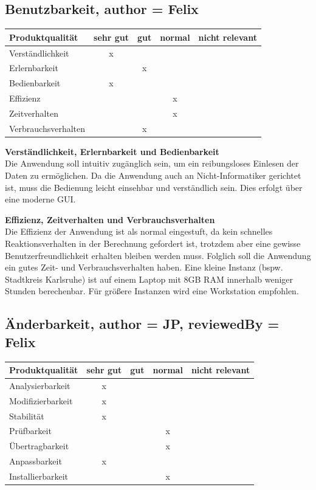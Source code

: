 \documentclass[parskip=full]{scrartcl} %
\begin{document}
\subsection{Benutzbarkeit, author = Felix}

    \begin{tabular}{|l| c| c| c| c|}
    \hline
        Produktqualität & sehr gut & gut & normal & nicht relevant \\
    \hline
        Verständlichkeit & x & & &\\
    \hline
        Erlernbarkeit & & x & &\\
    \hline
        Bedienbarkeit & x & & &\\
    \hline
        Effizienz & & & x &\\
    \hline
        Zeitverhalten & & & x &\\
    \hline
        Verbrauchsverhalten & & x & &\\
    \hline
    \end{tabular}

\textbf{Verständlichkeit, Erlernbarkeit und Bedienbarkeit}\\
Die Anwendung soll intuitiv zugänglich sein, um ein reibungsloses Einlesen der Daten zu ermöglichen. Da die Anwendung auch an Nicht-Informatiker gerichtet ist, muss die Bedienung leicht einsehbar und verständlich sein. Dies erfolgt über eine moderne GUI.

\textbf{Effizienz, Zeitverhalten und Verbrauchsverhalten}\\
Die Effizienz der Anwendung ist als normal eingestuft, da kein schnelles Reaktionsverhalten in der Berechnung gefordert ist, trotzdem aber eine gewisse Benutzerfreundlichkeit erhalten bleiben werden muss. Folglich soll die Anwendung ein gutes Zeit- und Verbrauchsverhalten haben.
Eine kleine Instanz (bspw. Stadtkreis Karlsruhe) ist auf einem Laptop mit 8GB RAM innerhalb weniger Stunden berechenbar. Für größere Instanzen wird eine Workstation empfohlen.


\newpage 


\subsection{Änderbarkeit, author = JP, reviewedBy = Felix}
    \begin{tabular}{|l| c| c| c| c|}
    \hline
        Produktqualität & sehr gut & gut & normal & nicht relevant \\
    \hline
        Analysierbarkeit & x & & & \\
    \hline
        Modifizierbarkeit & x & & &\\
    \hline
        Stabilität & x & & &\\
    \hline
        Prüfbarkeit & & & x &\\
    \hline
        Übertragbarkeit & & & x &\\
    \hline
        Anpassbarkeit & x & & &\\
    \hline
        Installierbarkeit & & & x &\\
    \hline
    \end{tabular}
    
\end{document}
